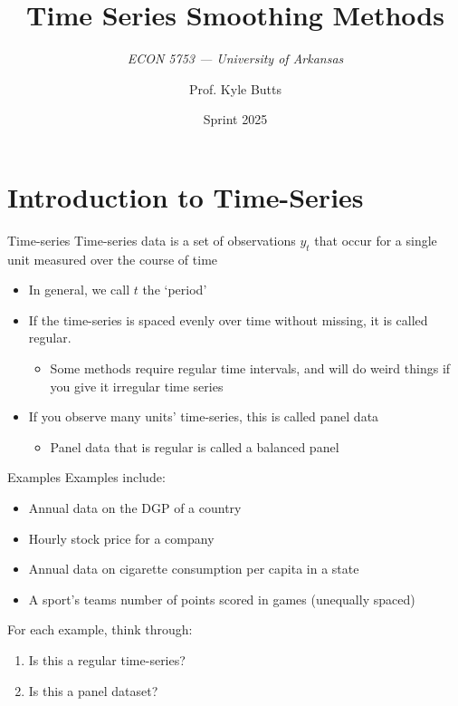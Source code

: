 \documentclass[aspectratio=169,t,11pt,table]{beamer}
\title{Time Series Smoothing Methods}
\subtitle{\it  ECON 5753 — University of Arkansas}
\date{Sprint 2025}
\author{Prof. Kyle Butts}
\begin{document}
\begin{frame}
\maketitle
\end{frame}

\section{Introduction to Time-Series}

\begin{frame}{Time-series}
  \alert{Time-series} data is a set of observations $y_t$ that occur for a single unit measured over the course of time
  \begin{itemize}
    \item In general, we call $t$ the `period'
    
    \medskip
    \item If the time-series is spaced evenly over time without missing, it is called \alert{regular}. 
    \begin{itemize}
      \item Some methods require regular time intervals, and will do weird things if you give it irregular time series
    \end{itemize}
    
    \medskip
    \item If you observe many units' time-series, this is called \alert{panel data}
    \begin{itemize}
      \item Panel data that is regular is called a \alert{balanced panel}
    \end{itemize}
  \end{itemize}
\end{frame}

\begin{frame}{Examples}
  Examples include:
  \begin{itemize}
    \item Annual data on the DGP of a country
    \item Hourly stock price for a company
    \item Annual data on cigarette consumption per capita in a state 
    \item A sport's teams number of points scored in games (unequally spaced)
  \end{itemize}

  \bigskip
  For each example, think through:
  \begin{enumerate}
    \item Is this a regular time-series?
    
    \item Is this a panel dataset?
  \end{enumerate}
\end{frame}
\end{document}
